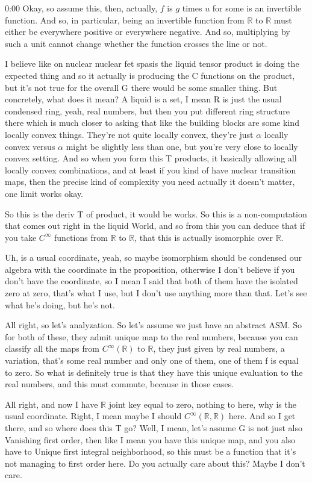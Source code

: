 \begin{unfinished}{0:00}
Okay, so assume this, then, actually, $f$ is $g$ times $u$ for some is an invertible function. And so, in particular, being an invertible function from $\mathbb{R}$ to $\mathbb{R}$ must either be everywhere positive or everywhere negative. And so, multiplying by such a unit cannot change whether the function crosses the line or not.

I believe like on nuclear nuclear fet spasis the liquid tensor product is doing the expected thing and so it actually is producing the C functions on the product, but it's not true for the overall G there would be some smaller thing. But concretely, what does it mean? A liquid is a set, I mean R is just the usual condensed ring, yeah, real numbers, but then you put different ring structure there which is much closer to asking that like the building blocks are some kind locally convex things. They're not quite locally convex, they're just $\alpha$ locally convex versus $\alpha$ might be slightly less than one, but you're very close to locally convex setting. And so when you form this T products, it basically allowing all locally convex combinations, and at least if you kind of have nuclear transition maps, then the precise kind of complexity you need actually it doesn't matter, one limit works okay.

So this is the deriv T of product, it would be works. So this is a non-computation that comes out right in the liquid World, and so from this you can deduce that if you take $C^\infty$ functions from $\mathbb{R}$ to $\mathbb{R}$, that this is actually isomorphic over $\mathbb{R}$. 

Uh, is a usual coordinate, yeah, so maybe isomorphism should be condensed our algebra with the coordinate in the proposition, otherwise I don't believe if you don't have the coordinate, so I mean I said that both of them have the isolated zero at zero, that's what I use, but I don't use anything more than that. Let's see what he's doing, but he's not.

All right, so let's analyzation. So let's assume we just have an abstract ASM. So for both of these, they admit unique map to the real numbers, because you can classify all the maps from $C^\infty(\mathbb{R})$ to $\mathbb{R}$, they just given by real numbers, a variation, that's some real number and only one of them, one of them f is equal to zero. So what is definitely true is that they have this unique evaluation to the real numbers, and this must commute, because in those cases.

All right, and now I have $\mathbb{R}$ joint key equal to zero, nothing to here, why is the usual coordinate. Right, I mean maybe I should $C^\infty(\mathbb{R}, \mathbb{R})$ here. And so I get there, and so where does this T go? Well, I mean, let's assume G is not just also Vanishing first order, then like I mean you have this unique map, and you also have to Unique first integral neighborhood, so this must be a function that it's not managing to first order here. Do you actually care about this? Maybe I don't care.


\end{unfinished}
